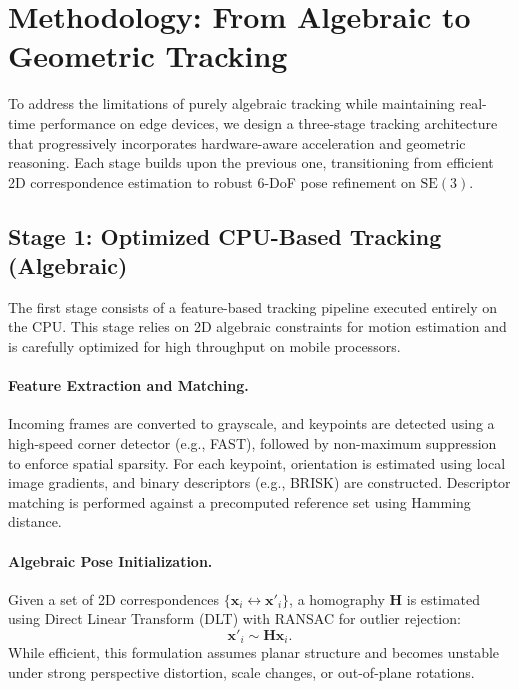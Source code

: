 \section{Methodology: From Algebraic to Geometric Tracking}

To address the limitations of purely algebraic tracking while maintaining real-time performance on edge devices, we design a three-stage tracking architecture that progressively incorporates hardware-aware acceleration and geometric reasoning. Each stage builds upon the previous one, transitioning from efficient 2D correspondence estimation to robust 6-DoF pose refinement on $\mathrm{SE}(3)$.



\subsection{Stage 1: Optimized CPU-Based Tracking (Algebraic)}

The first stage consists of a feature-based tracking pipeline executed entirely on the CPU. This stage relies on 2D algebraic constraints for motion estimation and is carefully optimized for high throughput on mobile processors.

\paragraph{Feature Extraction and Matching.}
Incoming frames are converted to grayscale, and keypoints are detected using a high-speed corner detector (e.g., FAST), followed by non-maximum suppression to enforce spatial sparsity. For each keypoint, orientation is estimated using local image gradients, and binary descriptors (e.g., BRISK) are constructed. Descriptor matching is performed against a precomputed reference set using Hamming distance.

\paragraph{Algebraic Pose Initialization.}
Given a set of 2D correspondences $\{\mathbf{x}_i \leftrightarrow \mathbf{x}'_i\}$, a homography $\mathbf{H}$ is estimated using Direct Linear Transform (DLT) with RANSAC for outlier rejection:
\begin{equation}
\mathbf{x}'_i \sim \mathbf{H}\mathbf{x}_i.
\end{equation}
While efficient, this formulation assumes planar structure and becomes unstable under strong perspective distortion, scale changes, or out-of-plane rotations.

